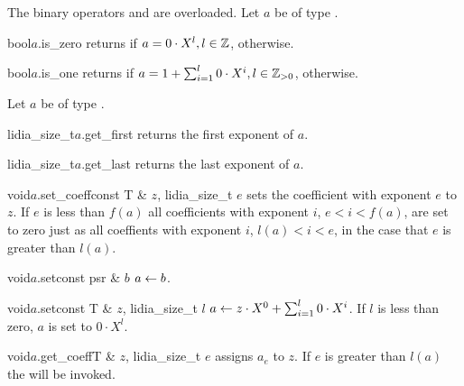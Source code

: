 
\COMP

The binary operators \code{==} and \code{!=} are overloaded.  Let $a$ be of type .

\begin{cfcode}{bool}{$a$.is_zero}{}
  returns \TRUE if $a = 0 \cdot X^l, l \in \mathbb{Z}$, \FALSE otherwise.
\end{cfcode}

\begin{cfcode}{bool}{$a$.is_one}{}
  returns \TRUE if $a = 1 + \sum_{i=1}^l 0 \cdot X^i, l \in \mathbb{Z}_{>0}$, \FALSE otherwise.
\end{cfcode}



\BASIC

Let $a$ be of type .

\begin{cfcode}{lidia_size_t}{$a$.get_first}{}
  returns the first exponent of $a$.
\end{cfcode}

\begin{cfcode}{lidia_size_t}{$a$.get_last}{}
  returns the last exponent of $a$.
\end{cfcode}

\begin{fcode}{void}{$a$.set_coeff}{const T & $z$, lidia_size_t $e$}
  sets the coefficient with exponent $e$ to $z$.  If $e$ is less than $f(a)$ all coefficients
  with exponent $i$, $e < i < f(a)$, are set to zero just as all coeffients with exponent $i$,
  $l(a) < i < e$, in the case that $e$ is greater than $l(a)$.
\end{fcode}

\begin{fcode}{void}{$a$.set}{const psr & $b$}
  $a \leftarrow b$.
\end{fcode}

\begin{fcode}{void}{$a$.set}{const T & $z$, lidia_size_t $l$}
  $a \leftarrow z \cdot X^0 + \sum_{i=1}^l 0 \cdot X^i$.  If $l$ is less than zero, $a$ is set to
  $0 \cdot X^l$.
\end{fcode}

\begin{fcode}{void}{$a$.get_coeff}{T & $z$, lidia_size_t $e$}
  assigns $a_e$ to $z$.  If $e$ is greater than $l(a)$ the \LEH will be invoked.
\end{fcode}


